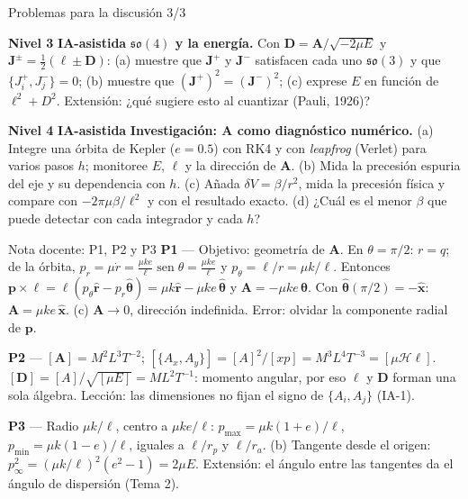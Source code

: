 \documentclass[aspectratio=169]{beamer}
\newif\ifdocente
\providecommand{\sen}{}
\renewcommand{\sen}{\operatorname{sen}}
\newcommand{\vp}{\mathbf p}
\newcommand{\vA}{\mathbf A}
\newcommand{\vD}{\mathbf D}
\newcommand{\vl}{\boldsymbol\ell}
\newcommand{\rh}{\hat{\mathbf r}}
\newcommand{\thh}{\hat{\boldsymbol\theta}}
\newcommand{\PB}[2]{\{#1,#2\}}
\newcommand{\Hc}{\mathcal H}
\newcommand{\IAasistida}{\colorbox{yellow!30}{\scriptsize\textbf{IA-asistida}}}
\newcommand{\nivel}[1]{\colorbox{blue!12}{\scriptsize\textbf{Nivel #1}}}
\begin{document}
\begin{frame}{Problemas para la discusión 3/3}
\small
\begin{description}[P0]
  \item[P7] \nivel{3} \IAasistida{} \textbf{$\mathfrak{so}(4)$ y la energía.}
        Con $\vD=\vA/\sqrt{-2\mu E}$ y $\mathbf J^{\pm}=\tfrac12(\vl\pm\vD)$:
        (a) muestre que $\mathbf J^{+}$ y $\mathbf J^{-}$ satisfacen cada uno $\mathfrak{so}(3)$ y que
        $\PB{J^{+}_i}{J^{-}_j}=0$; (b) muestre que $(\mathbf J^{+})^{2}=(\mathbf J^{-})^{2}$;
        (c) exprese $E$ en función de $\ell^{2}+D^{2}$.
        Extensión: ¿qué sugiere esto al cuantizar (Pauli, 1926)?
  \item[P8] \nivel{4} \IAasistida{} \textbf{Investigación: $\vA$ como diagnóstico numérico.}
        (a) Integre una órbita de Kepler ($e=0.5$) con RK4 y con \emph{leapfrog} (Verlet) para
        varios pasos $h$; monitoree $E$, $\vl$ y la dirección de $\vA$.
        (b) Mida la precesión espuria del eje y su dependencia con $h$.
        (c) Añada $\delta V=\beta/r^{2}$, mida la precesión física y compare con
        $-2\pi\mu\beta/\ell^{2}$ y con el resultado exacto.
        (d) ¿Cuál es el menor $\beta$ que puede detectar con cada integrador y cada $h$?
\end{description}
\end{frame}

\ifdocente
\begin{frame}{Nota docente: P1, P2 y P3}
\footnotesize
\textbf{P1} — Objetivo: geometría de $\vA$.
En $\theta=\pi/2$: $r=q$; de la órbita, $p_r=\mu\dot r=\frac{\mu k e}{\ell}\sen\theta=\frac{\mu k e}{\ell}$
y $p_\theta=\ell/r=\mu k/\ell$. Entonces
$\vp\times\vl=\ell(p_\theta\rh-p_r\thh)=\mu k\rh-\mu k e\,\thh$ y $\vA=-\mu k e\,\thh$. Con $\thh(\pi/2)=-\hat{\mathbf x}$:
$\vA=\mu k e\,\hat{\mathbf x}$. \checkmark\; (c) $\vA\to0$, dirección indefinida.
Error: olvidar la componente radial de $\vp$.

\textbf{P2} — $[\vA]=M^{2}L^{3}T^{-2}$; $[\PB{A_x}{A_y}]=[A]^{2}/[xp]=M^{3}L^{4}T^{-3}=[\mu\Hc\ell]$. \checkmark\;
$[\vD]=[A]/\sqrt{[\mu E]}=ML^{2}T^{-1}$: momento angular, por eso $\vl$ y $\vD$ forman una sola
álgebra. Lección: las dimensiones no fijan el signo de $\PB{A_i}{A_j}$ (IA-1).

\textbf{P3} — Radio $\mu k/\ell$, centro a $\mu k e/\ell$: $p_{\max}=\mu k(1+e)/\ell$,
$p_{\min}=\mu k(1-e)/\ell$, iguales a $\ell/r_p$ y $\ell/r_a$. \checkmark\;
(b) Tangente desde el origen: $p_\infty^{2}=(\mu k/\ell)^{2}(e^{2}-1)=2\mu E$. \checkmark\;
Extensión: el ángulo entre las tangentes da el ángulo de dispersión (Tema 2).
\end{frame}
\end{document}
